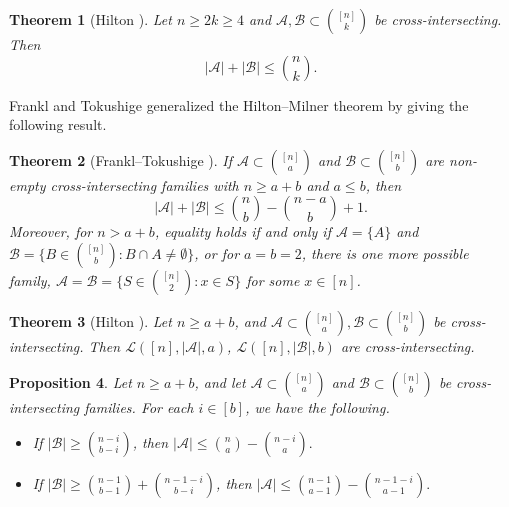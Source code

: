 \documentclass[a4paper,11pt]{article}
\newtheorem{theorem}{Theorem}[section]
\newtheorem{proposition}[theorem]{Proposition}
\newcommand{\m}{\mathcal}
\begin{document}
\begin{theorem}[Hilton \cite{Hilton1977}]\label{3-12-2}
Let  $ n \ge  2k \ge 4 $ and  $ \mathcal{A}, \mathcal{B} \subset \binom{[n]}{k} $ be cross-intersecting. Then  
\begin{equation}\label{3-17-2}
|\mathcal{A}| + |\mathcal{B}| \leq \binom{n}{k}.
\end{equation}
\end{theorem}


Frankl and Tokushige \cite{FT1992} generalized the Hilton--Milner theorem by giving the following result.

\begin{theorem}[Frankl--Tokushige \cite{FT1992}]\label{12-3-2}
If $\mathcal{A} \subset \binom{[n]}{a}$ and $\mathcal{B} \subset \binom{[n]}{b}$ are non-empty cross-intersecting families with $n \ge a + b$ and $a \le b$, then
\[
|\mathcal{A}| + |\mathcal{B}| \le \binom{n}{b} - \binom{n-a}{b} + 1.
\]
Moreover, for $n > a + b$, equality holds if and only if $\mathcal{A} = \{A\}$ and $\mathcal{B} = \{B \in \binom{[n]}{b} : B \cap A \neq \emptyset\}$, or for $a = b = 2$, there is one more possible family, $\mathcal{A} = \mathcal{B} = \{S \in \binom{[n]}{2} : x \in S\}$ for some $x \in [n]$.
\end{theorem}

\begin{theorem}[Hilton \cite{12-1-4}]\label{12-1-1}
Let $n\ge a+b$, and $\mathcal{A}\subset {[n]\choose a},\mathcal{B}\subset {[n]\choose b}$ be cross-intersecting. Then $\mathcal{L}([n], |\mathcal{A}|,a)$, $\mathcal{L}([n], |\mathcal{B}|,b)$ are cross-intersecting.
\end{theorem}


\begin{proposition}\label{lowerupper}
Let $n\ge a+b$, and let $\mathcal{A} \subset \binom{[n]}{a}$ and $\mathcal{B} \subset \binom{[n]}{b}$ be cross-intersecting families. For each $i\in [b]$, we have the following. 
\begin{itemize}
\item[(i)] If $|\m B|\ge {n-i \choose b-i}$,  then 
$
|\mathcal{A}|  \le {n\choose a}-{n-i\choose a}.
$
\item[(ii)] If $|\m B|\ge {n-1 \choose b-1}+{n-1-i\choose b-i}$,  then 
$
|\mathcal{A}|  \le {n-1\choose a-1}-{n-1-i\choose a-1}.
$
\end{itemize}
\end{proposition}
\end{document}
